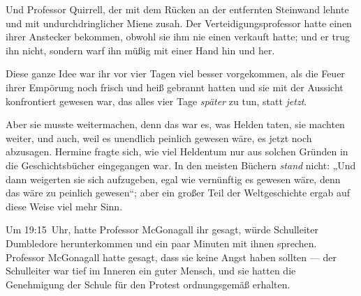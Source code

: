 Und Professor Quirrell, der mit dem Rücken an der entfernten Steinwand lehnte und mit undurchdringlicher Miene zusah. Der Verteidigungsprofessor hatte einen ihrer Anstecker bekommen, obwohl sie ihm nie einen verkauft hatte; und er trug ihn nicht, sondern warf ihn müßig mit einer Hand hin und her.

Diese ganze Idee war ihr vor vier Tagen viel besser vorgekommen, als die Feuer ihrer Empörung noch frisch und heiß gebrannt hatten und sie mit der Aussicht konfrontiert gewesen war, das alles vier Tage \emph{später} zu tun, statt \emph{jetzt}.

Aber sie musste weitermachen, denn das war es, was Helden taten, sie machten weiter, und auch, weil es unendlich peinlich gewesen wäre, es jetzt noch abzusagen. Hermine fragte sich, wie viel Heldentum nur aus solchen Gründen in die Geschichtsbücher eingegangen war. In den meisten Büchern \emph{stand} nicht:
„Und dann weigerten sie sich aufzugeben, egal wie vernünftig es gewesen wäre, denn das wäre zu peinlich gewesen“; aber ein großer Teil der Weltgeschichte ergab auf diese Weise viel mehr Sinn.

Um 19:15~Uhr, hatte Professor McGonagall ihr gesagt, würde Schulleiter Dumbledore herunterkommen und ein paar Minuten mit ihnen sprechen. Professor McGonagall hatte gesagt, dass sie keine Angst haben sollten — der Schulleiter war tief im Inneren ein guter Mensch, und sie hatten die Genehmigung der Schule für den Protest ordnungsgemäß erhalten.

